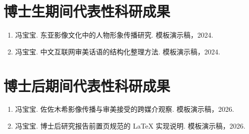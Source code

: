\chapter*{博士生期间代表性科研成果}

\begin{enumerate}
  \item 冯宝宝. 东亚影像文化中的人物形象传播研究. 模板演示稿，2024.
  \item 冯宝宝. 中文互联网审美话语的结构化整理方法. 模板演示稿，2024.
\end{enumerate}

\chapter*{博士后期间代表性科研成果}

\begin{enumerate}
  \item 冯宝宝. 佐佐木希影像传播与审美接受的跨媒介观察. 模板演示稿，2026.
  \item 冯宝宝. 博士后研究报告前置页规范的 LaTeX 实现说明. 模板演示稿，2026.
\end{enumerate}
